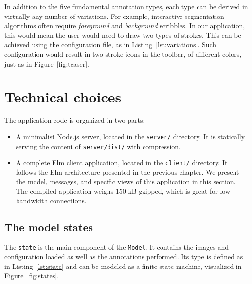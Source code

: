 In addition to the five fundamental annotation types,
each type can be derived in virtually any number of variations.
For example, interactive segmentation algorithms often require
\textit{foreground} and \textit{background} scribbles.
In our application, this would mean the user would need to draw two types of strokes.
This can be achieved using the configuration file,
as in Listing~\ref{lst:variations}.
Such configuration would result in two stroke icons in the toolbar,
of different colors, just as in Figure~\ref{fig:teaser}.




\section{Technical choices}

The application code is organized in two parts:

\begin{itemize}
\item A minimalist Node.js server, located in the \verb|server/| directory.
	It is statically serving the content of \verb|server/dist/|
    with compression.
\item A complete Elm client application, located in the \verb|client/| directory.
    It follows the Elm architecture presented in the previous chapter.
    We present the model, messages, and specific views of this application in this section.
    The compiled application weighs 150 kB gzipped,
    which is great for low bandwidth connections.
\end{itemize}


\subsection{The model states}

The \verb|state| is the main component of the \verb|Model|.
It contains the images and configuration loaded as well as the annotations performed.
Its type is defined as in Listing~\ref{lst:state}
and can be modeled as a finite state machine, visualized in Figure~\ref{fig:states}.



